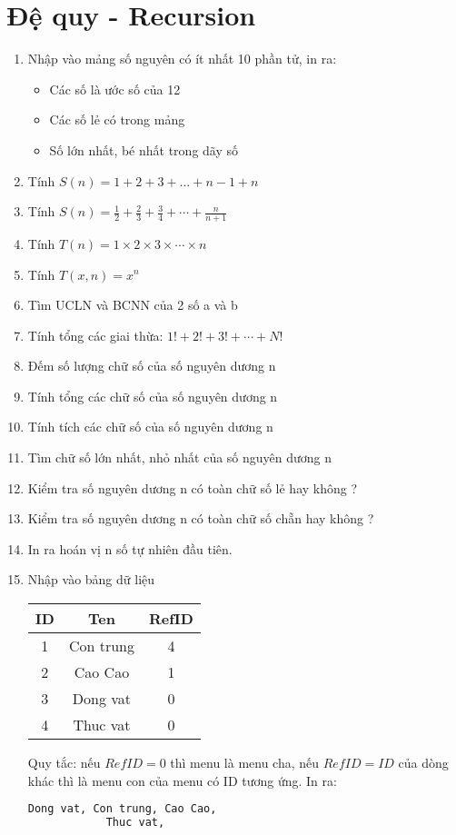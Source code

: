 \documentclass[12pt,a4paper]{article}
\begin{document}
\section{Đệ quy - Recursion}
\begin{enumerate}
	\item Nhập vào mảng số nguyên có ít nhất 10 phần tử, in ra:
	\begin{itemize}
		\item Các số là ước số của 12
		\item Các số lẻ có trong mảng
		\item Số lớn nhất, bé nhất trong dãy số
	\end{itemize}		
	 
	\item Tính $S(n) = 1 + 2 + 3 + ... + n - 1 + n$
	\item Tính $S(n) = \frac{1}{2} + \frac{2}{3} + \frac{3}{4} + \cdots + \frac{n}{n + 1}$
	\item Tính $T(n) = 1\times 2\times 3\times \cdots \times n$
	\item Tính $T(x,n) = x^n$
	\item Tìm UCLN và BCNN của 2 số a và b
	\item Tính tổng các giai thừa: $1! + 2! + 3!+ \cdots + N!$
	\item Đếm số lượng chữ số của số nguyên dương n
	\item Tính tổng các chữ số của số nguyên dương n
	\item Tính tích các chữ số của số nguyên dương n
	\item Tìm chữ số lớn nhất, nhỏ nhất của số nguyên dương n
	\item Kiểm tra số nguyên dương n có toàn chữ số lẻ hay không ?
	\item Kiểm tra số nguyên dương n có toàn chữ số chẵn hay không ?
	\item In ra hoán vị n số tự nhiên đầu tiên.
	
	\item Nhập vào bảng dữ liệu
		\begin{center}
			\begin{tabular}{ |c|c|c| } 
				\hline
					ID & Ten & RefID \\
				\hline
					1 & Con trung & 4 \\
				\hline
					2 & Cao Cao & 1 \\
				\hline	
					3 & Dong vat & 0 \\
				\hline
					4 & Thuc vat & 0 \\
				\hline
			\end{tabular}
		\end{center}
		Quy tắc: nếu $RefID = 0$ thì menu là menu cha, nếu $RefID = ID$ của dòng khác thì là menu con của menu có ID tương ứng. In ra:
		\begin{lstlisting}[language=bash]
			Dong vat, Con trung, Cao Cao,
			Thuc vat, 
		\end{lstlisting}
		
\end{enumerate}
\end{document}
